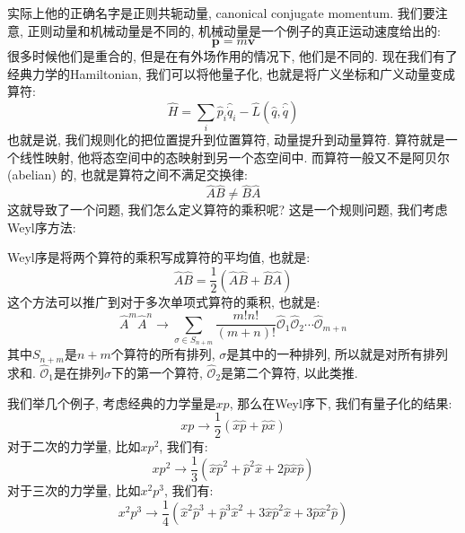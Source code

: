 实际上他的正确名字是正则共轭动量, canonical conjugate momentum.
我们要注意, 正则动量和机械动量是不同的, 机械动量是一个例子的真正运动速度给出的:
\begin{equation}
  \bm{p} = m \bm{v}
\end{equation}
很多时候他们是重合的, 但是在有外场作用的情况下, 他们是不同的.
现在我们有了经典力学的Hamiltonian, 我们可以将他量子化, 也就是将广义坐标和广义动量变成算符:
\begin{equation}
  \hat{H} = \sum_i \hat{p}_i \hat{\dot{q}}_i - \hat{L}(\hat{q}, \hat{\dot{q}})
\end{equation}
也就是说, 我们规则化的把位置提升到位置算符, 动量提升到动量算符.
算符就是一个线性映射, 他将态空间中的态映射到另一个态空间中.
而算符一般又不是阿贝尔 (abelian) 的, 也就是算符之间不满足交换律:
\begin{equation}
  \hat{A} \hat{B} \neq \hat{B} \hat{A}
\end{equation}
这就导致了一个问题, 我们怎么定义算符的乘积呢?
这是一个规则问题, 我们考虑Weyl序方法:
\begin{definition}[][Weyl序]
  Weyl序是将两个算符的乘积写成算符的平均值, 也就是:
  \begin{equation}
    \hat{A} \hat{B} = \frac{1}{2} (\hat{A} \hat{B} + \hat{B} \hat{A})
  \end{equation}
  这个方法可以推广到对于多次单项式算符的乘积, 也就是:
  \begin{equation}
    \hat{A}^m \hat{A}^n \to \sum_{\sigma \in S_{n+m}} \frac{m! n!}{(m+n)!} \hat{\mathcal{O}}_1 \hat{\mathcal{O}}_2 \cdots \hat{\mathcal{O}}_{m+n}
  \end{equation}
  其中$S_{n+m}$是$n+m$个算符的所有排列, $\sigma$是其中的一种排列, 所以就是对所有排列求和.
  $\hat{\mathcal{O}}_1$是在排列$\sigma$下的第一个算符, $\hat{\mathcal{O}}_2$是第二个算符, 以此类推.
\end{definition}
我们举几个例子, 考虑经典的力学量是$xp$, 那么在Weyl序下, 我们有量子化的结果:
\begin{equation}
  xp \to \frac{1}{2} (\hat{x} \hat{p} + \hat{p} \hat{x})
\end{equation}
对于二次的力学量, 比如$xp^2$, 我们有:
\begin{equation}
  xp^2 \to \frac{1}{3} (\hat{x} \hat{p}^2 + \hat{p}^2 \hat{x} + 2 \hat{p} \hat{x} \hat{p})
\end{equation}
对于三次的力学量, 比如$x^2 p^3$, 我们有:
\begin{equation}
  x^2 p^3 \to \frac{1}{4} (\hat{x}^2 \hat{p}^3 + \hat{p}^3 \hat{x}^2 + 3 \hat{x} \hat{p}^2 \hat{x} + 3 \hat{p} \hat{x}^2 \hat{p})
\end{equation}
